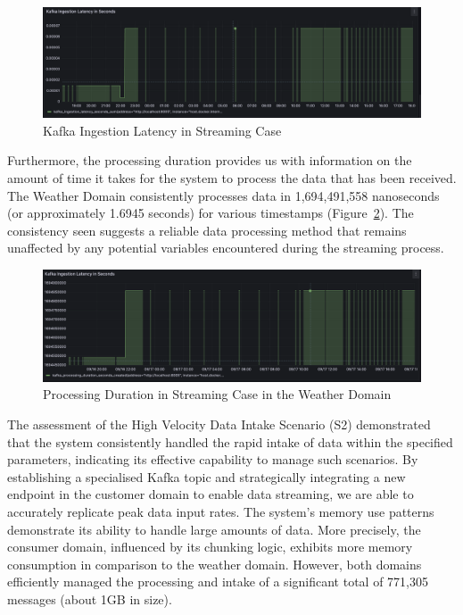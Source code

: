 \documentclass{ieeeaccess}
\begin{document}
\begin{figure}

  \centering

  \includegraphics[width=\textwidth]{images/kafka-ingestion-latency-sum-streaming-case.png}

  \caption{Kafka Ingestion Latency in Streaming Case}

  \label{kafkaIngestionLatencyInStreamingCase}

\end{figure}

Furthermore, the processing duration provides us with information on the amount of time it takes for the system to process the data that has been received. The Weather Domain consistently processes data in 1,694,491,558 nanoseconds (or approximately 1.6945 seconds) for various timestamps (Figure~\ref{processingDurationInStreamingCaseInWeatherDomain}). The consistency seen suggests a reliable data processing method that remains unaffected by any potential variables encountered during the streaming process.

\begin{figure}

  \centering

  \includegraphics[width=\textwidth]{images/processing-duration-streaming-case-in-weather-domain.png}

  \caption{Processing Duration in Streaming Case in the Weather Domain}

  \label{processingDurationInStreamingCaseInWeatherDomain}

\end{figure}

The assessment of the High Velocity Data Intake Scenario (S2) demonstrated that the system consistently handled the rapid intake of data within the specified parameters, indicating its effective capability to manage such scenarios. By establishing a specialised Kafka topic and strategically integrating a new endpoint in the customer domain to enable data streaming, we are able to accurately replicate peak data input rates. The system's memory use patterns demonstrate its ability to handle large amounts of data. More precisely, the consumer domain, influenced by its chunking logic, exhibits more memory consumption in comparison to the weather domain. However, both domains efficiently managed the processing and intake of a significant total of 771,305 messages (about 1GB in size). 
\end{document}
